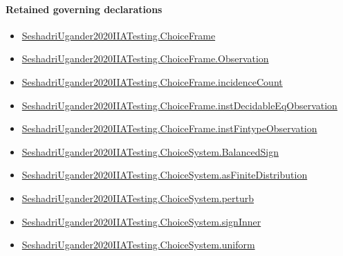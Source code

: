 \documentclass[10pt]{article}
\begin{document}
\paragraph{Retained governing declarations}
\begin{itemize}\raggedright
\item \hyperlink{paper-prerequisite-0b24d39c6f4d1898}{Seshadri\allowbreak{}Ugander2020\allowbreak{}IIA\allowbreak{}Testing.\allowbreak{}Choice\allowbreak{}Frame}
\item \hyperlink{paper-prerequisite-d450557e9618e377}{Seshadri\allowbreak{}Ugander2020\allowbreak{}IIA\allowbreak{}Testing.\allowbreak{}Choice\allowbreak{}Frame.\allowbreak{}Observation}
\item \hyperlink{governing-declaration-01f88aa0e8a82d94}{Seshadri\allowbreak{}Ugander2020\allowbreak{}IIA\allowbreak{}Testing.\allowbreak{}Choice\allowbreak{}Frame.\allowbreak{}incidence\allowbreak{}Count}
\item \hyperlink{governing-declaration-ad61eb0534c5ba6e}{Seshadri\allowbreak{}Ugander2020\allowbreak{}IIA\allowbreak{}Testing.\allowbreak{}Choice\allowbreak{}Frame.\allowbreak{}inst\allowbreak{}Decidable\allowbreak{}Eq\allowbreak{}Observation}
\item \hyperlink{governing-declaration-a7119ec24e922f45}{Seshadri\allowbreak{}Ugander2020\allowbreak{}IIA\allowbreak{}Testing.\allowbreak{}Choice\allowbreak{}Frame.\allowbreak{}inst\allowbreak{}Fintype\allowbreak{}Observation}
\item \hyperlink{paper-prerequisite-67c484d987d2d6ab}{Seshadri\allowbreak{}Ugander2020\allowbreak{}IIA\allowbreak{}Testing.\allowbreak{}Choice\allowbreak{}System.\allowbreak{}Balanced\allowbreak{}Sign}
\item \hyperlink{governing-declaration-84db14e23cd406b0}{Seshadri\allowbreak{}Ugander2020\allowbreak{}IIA\allowbreak{}Testing.\allowbreak{}Choice\allowbreak{}System.\allowbreak{}as\allowbreak{}Finite\allowbreak{}Distribution}
\item \hyperlink{paper-prerequisite-32d90e854afe59fd}{Seshadri\allowbreak{}Ugander2020\allowbreak{}IIA\allowbreak{}Testing.\allowbreak{}Choice\allowbreak{}System.\allowbreak{}perturb}
\item \hyperlink{governing-declaration-fed3cec450b6ea44}{Seshadri\allowbreak{}Ugander2020\allowbreak{}IIA\allowbreak{}Testing.\allowbreak{}Choice\allowbreak{}System.\allowbreak{}sign\allowbreak{}Inner}
\item \hyperlink{governing-declaration-2f9ec7a44c87f45e}{Seshadri\allowbreak{}Ugander2020\allowbreak{}IIA\allowbreak{}Testing.\allowbreak{}Choice\allowbreak{}System.\allowbreak{}uniform}

\end{itemize}
\end{document}
